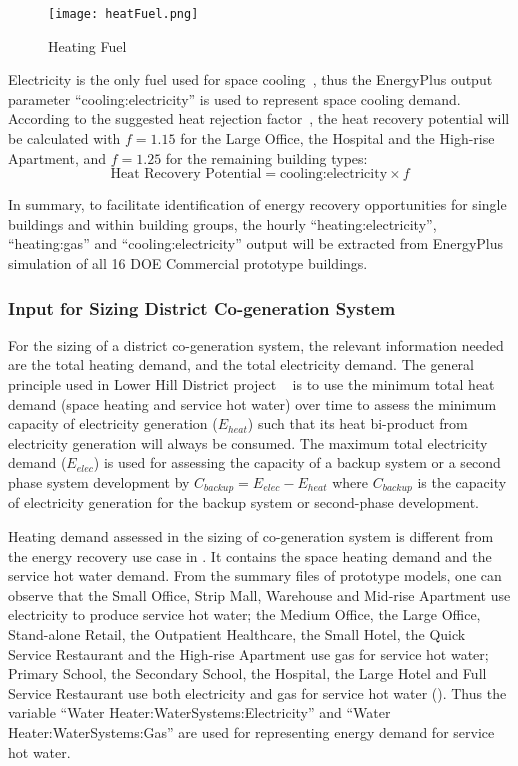 \begin{figure}[h!]
  \centering
  \texttt{[image: heatFuel.png]}
  \caption[Heating Fuel]{Heating Fuel}
  \label{fig:heatFuel}
\end{figure}

Electricity is the only fuel used for space cooling~\cite{DOE2015},
thus the EnergyPlus output parameter ``cooling:electricity'' is used
to represent space cooling demand. According to the suggested heat
rejection factor~\cite{Bhatia2015}, the heat recovery potential will
be calculated with $f = 1.15$ for the Large Office, the Hospital and the High-rise
Apartment, and $f = 1.25$ for the remaining building types:
\begin{equation}\label{eq:recover}
\text{Heat Recovery Potential} = \text{cooling:electricity} \times f
\end{equation}

In summary, to facilitate identification of energy recovery
opportunities for single buildings and within building groups, the
hourly ``heating:electricity'', ``heating:gas'' and
``cooling:electricity'' output will be extracted from EnergyPlus
simulation of all 16 DOE Commercial prototype buildings.

\subsubsection{Input for Sizing District Co-generation
  System}
For the sizing of a district co-generation system, the relevant
information needed are the total heating demand, and the total
electricity demand. The general principle used in Lower Hill District
project ~\cite{baird2014} is to use the minimum total heat demand
(space heating and service hot water) over time to assess the minimum
capacity of electricity generation ($E_{heat}$) such that its heat
bi-product from electricity generation will always be consumed. The
maximum total electricity demand ($E_{elec}$) is used for assessing
the capacity of a backup system or a second phase system development
by $C_{backup} = E_{elec} - E_{heat}$ where $C_{backup}$ is the
capacity of electricity generation for the backup system or
second-phase development.

Heating demand assessed in the sizing of co-generation system is
different from the energy recovery use case in 
.  It contains the space heating demand and the service hot water
demand. From the summary files of prototype models, one can observe
that the Small Office, Strip Mall, Warehouse and Mid-rise Apartment use
electricity to produce service hot water; the Medium Office, the Large Office,
Stand-alone Retail, the Outpatient Healthcare, the Small Hotel, the Quick Service
Restaurant and the High-rise Apartment use gas for service hot water;
Primary School, the Secondary School, the Hospital, the Large Hotel and Full
Service Restaurant use both electricity and gas for service hot water
(). Thus the variable ``Water
Heater:WaterSystems:Electricity'' and ``Water
Heater:WaterSystems:Gas'' are used for representing energy demand for
service hot water.

